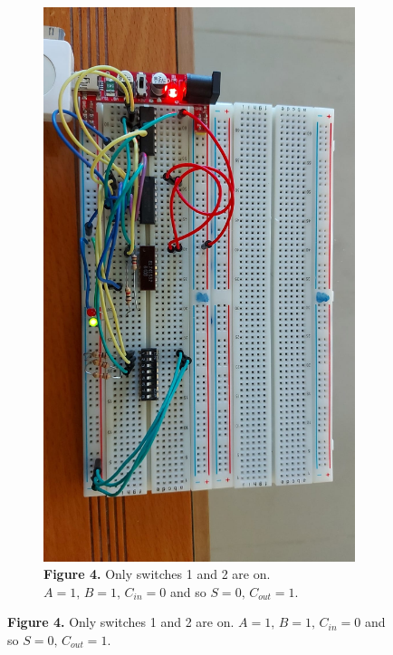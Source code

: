\documentclass[a4paper]{article}
\begin{document}
\begin{figure}
     \begin{subfigure}[b]{0.9\textwidth}
         \centering
        \includegraphics[angle=90, width=\textwidth]{12on.jpeg}
         \caption*{\textbf{Figure 4.} Only switches 1 and 2 are on. $A=1,\,B=1,\, C_{in} = 0$ and so $S=0,\,C_{out}=1$.\vspace{2em}}
         \label{fig:1on}
     \end{subfigure}
   \end{figure}
\end{document}
